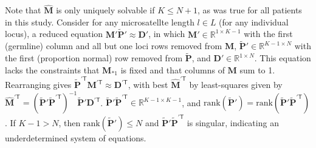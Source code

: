 Note that $\hat{\mathbf{M}}$ is only uniquely solvable if $K \leq N + 1$, as was true for all patients in this study. Consider for any microsatellte length $l \in L$ (for any individual locus), a reduced equation $\mathbf{M'} \mathbf{\tilde{P}'} \approx \mathbf{D'}$, in which $\mathbf{M'} \in \mathbb{R}^{1 \times K-1}$ with the first (germline) column and all but one loci rows removed from $\mathbf{M}$, $\mathbf{\tilde{P}'} \in \mathbb{R}^{K-1 \times N}$ with the first (proportion normal) row removed from $\mathbf{\tilde{P}}$, and $\mathbf{D'} \in \mathbb{R}^{1 \times N}$. This equation lacks the constraints that $\mathbf{M}_{*1}$ is fixed and that columns of $\mathbf{M}$ sum to 1. Rearranging gives $\mathbf{\tilde{P}}^{\prime \mathsf{T}} \mathbf{M}^{\prime \mathsf{T}} \approx \mathbf{D}^{\prime \mathsf{T}}$, with best $\hat{\mathbf{M}}^{\prime \mathsf{T}}$ by least-squares given by $\hat{\mathbf{M}}^{\prime \mathsf{T}} = (\mathbf{\tilde{P}'}\mathbf{\tilde{P}}^{\prime \mathsf{T}})^{-1}\mathbf{\tilde{P}'}\mathbf{D}^{\prime \mathsf{T}}$. $\mathbf{\tilde{P}'}\mathbf{\tilde{P}}^{\prime \mathsf{T}} \in \mathbb{R}^{K-1 \times K-1}$, and $\text{rank}(\mathbf{\tilde{P}'}) = \text{rank}(\mathbf{\tilde{P}'}\mathbf{\tilde{P}}^{\prime \mathsf{T}})$. If $K - 1 > N$, then $\text{rank}(\mathbf{\tilde{P}'}) \leq N$ and $\mathbf{\tilde{P}'}\mathbf{\tilde{P}}^{\prime \mathsf{T}}$ is singular, indicating an underdetermined system of equations.

